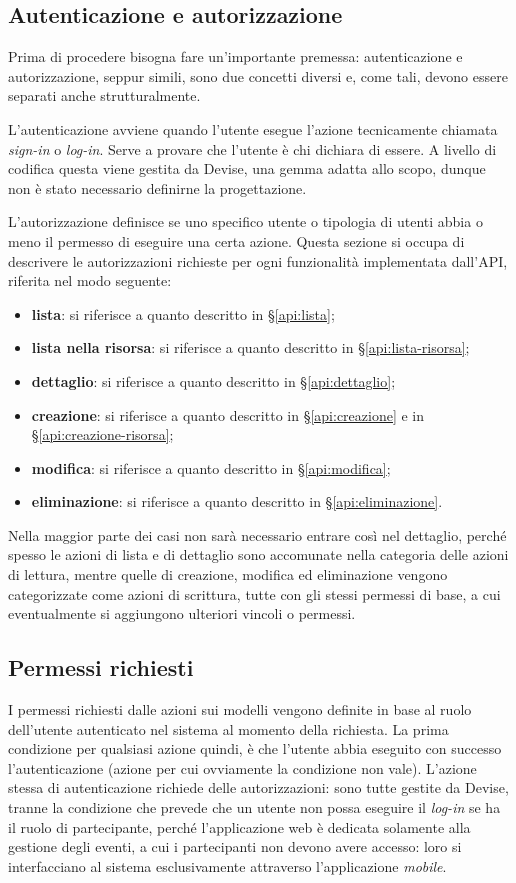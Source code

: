 \subsection{Autenticazione e autorizzazione}
Prima di procedere bisogna fare un'importante premessa: autenticazione e autorizzazione, seppur simili, sono due concetti diversi e, come tali, devono essere separati anche strutturalmente.

L'autenticazione avviene quando l'utente esegue l'azione tecnicamente chiamata \emph{sign-in} o \emph{log-in}. Serve a provare che l'utente è chi dichiara di essere. A livello di codifica questa viene gestita da Devise, una gemma adatta allo scopo, dunque non è stato necessario definirne la progettazione.

L'autorizzazione definisce se uno specifico utente o tipologia di utenti abbia o meno il permesso di eseguire una certa azione. Questa sezione si occupa di descrivere le autorizzazioni richieste per ogni funzionalità implementata dall'API, riferita nel modo seguente:
\begin{itemize}
	\item \textbf{lista}: si riferisce a quanto descritto in \S \ref{api:lista};
	\item \textbf{lista nella risorsa}: si riferisce a quanto descritto in \S \ref{api:lista-risorsa};
	\item \textbf{dettaglio}: si riferisce a quanto descritto in \S \ref{api:dettaglio};
	\item \textbf{creazione}: si riferisce a quanto descritto in \S \ref{api:creazione} e in \S \ref{api:creazione-risorsa};
	\item \textbf{modifica}: si riferisce a quanto descritto in \S \ref{api:modifica};
	\item \textbf{eliminazione}: si riferisce a quanto descritto in \S \ref{api:eliminazione}.
\end{itemize}
Nella maggior parte dei casi non sarà necessario entrare così nel dettaglio, perché spesso le azioni di lista e di dettaglio sono accomunate nella categoria delle azioni di lettura, mentre quelle di creazione, modifica ed eliminazione vengono categorizzate come azioni di scrittura, tutte con gli stessi permessi di base, a cui eventualmente si aggiungono ulteriori vincoli o permessi.

\subsection{Permessi richiesti} \label{api:permessi-richiesti}
I permessi richiesti dalle azioni sui modelli vengono definite in base al ruolo dell'utente autenticato nel sistema al momento della richiesta. La prima condizione per qualsiasi azione quindi, è che l'utente abbia eseguito con successo l'autenticazione (azione per cui ovviamente la condizione non vale). L'azione stessa di autenticazione richiede delle autorizzazioni: sono tutte gestite da Devise, tranne la condizione che prevede che un utente non possa eseguire il \emph{log-in} se ha il ruolo di partecipante, perché l'applicazione web è dedicata solamente alla gestione degli eventi, a cui i partecipanti non devono avere accesso: loro si interfacciano al sistema esclusivamente attraverso l'applicazione \emph{mobile}.

